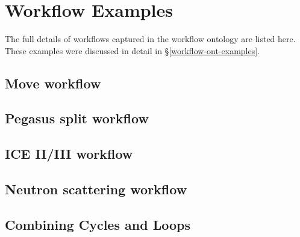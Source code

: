 \chapter*{Workflow Examples}
\label{app:workflow-examples}

The full details of workflows captured in the workflow ontology are listed here.
These examples were discussed in detail in \S \ref{workflow-ont-examples}.

\section{Move workflow}
\label{app:move-workflow}



\section{Pegasus split workflow}
\label{app:pegasus-workflow}



\section{ICE II/III workflow}
\label{app:ice-workflow}



\section{Neutron scattering workflow}
\label{app:neutron-workflow}



\section{Combining Cycles and Loops}
\label{app:cycle-loop-test}

